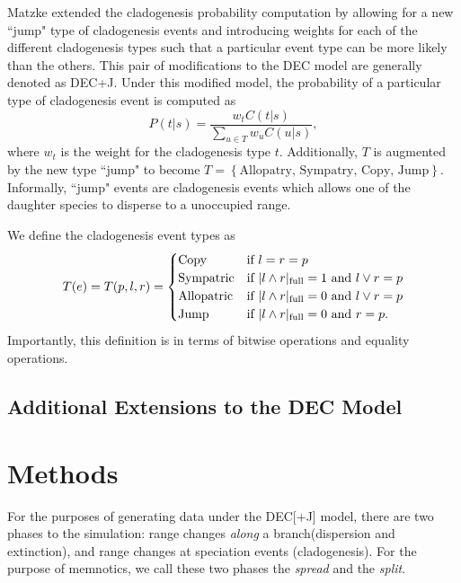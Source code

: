 \documentclass{article}
\begin{document}
Matzke\cite{ModelSelectionMatzke2014} extended the cladogenesis probability
computation by allowing for a new ``jump" type of cladogenesis events and
introducing weights for each of the different cladogenesis types such that a
particular event type can be more likely than the others.
This pair of modifications to the DEC model are generally denoted as DEC+J.
Under this modified model, the probability of a particular type of cladogenesis
event is computed as
\begin{equation}
	P(t | s) = \frac{w_t C(t | s)}{\sum_{u \in T} w_u C(u |
		s)},
\end{equation}
where $w_t$ is the weight for the cladogenesis type $t$.
Additionally, $T$ is augmented by the new type ``jump" to become \(T =
\left\{\text{Allopatry, Sympatry, Copy, Jump}\right\} \).
Informally, ``jump" events are cladogenesis events which allows one of the
daughter species to disperse to a unoccupied range.

We define the cladogenesis event types as
\begin{equation}
T(e) = T(p, l, r) = 
\begin{cases}
  \text{Copy} & \text{if }l = r = p \\ 
  \text{Sympatric} & \text{if } |l \land r|_\text{full} = 1 \text{ and } l \lor r = p \\ 
  \text{Allopatric} & \text{if } |l \land r|_\text{full} = 0 \text{ and } l \lor r = p   \\ 
  \text{Jump} & \text{if } |l \land r|_\text{full} = 0 \text{ and } r = p. \\ 
\end{cases}
\label{eq:clad-test}
\end{equation}
Importantly, this definition is in terms of bitwise operations and equality
operations.

\subsection{Additional Extensions to the DEC Model}

\section{Methods}

For the purposes of generating data under the DEC[+J] model, there are two
phases to the simulation: range changes \textit{along} a branch(dispersion and
extinction), and range changes at speciation events (cladogenesis).
For the purpose of memnotics, we call these two phases the \textit{spread} and
the \textit{split}.
\end{document}
